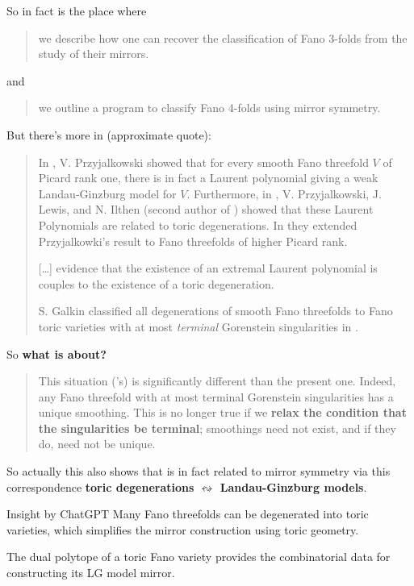 So in fact  \cite{mifa} is the place where 
\begin{quotation}
we describe how one can recover the classification of Fano 3-folds from the study of their mirrors.
\end{quotation}
and
\begin{quotation}
	we outline a program to classify Fano 4-folds using mirror symmetry.
\end{quotation}
But there's more in \cite{jan4} (approximate quote):
\begin{quotation}
	In \cite{prz09}, V. Przyjalkowski showed that for every smooth Fano threefold $V$ of Picard rank one, there is in fact a Laurent polynomial giving a weak Landau-Ginzburg model for $V$. Furthermore, in \cite{ilp13}, V. Przyjalkowski, J. Lewis, and N. Ilthen (second author of \cite{jan4}) showed that these Laurent Polynomials are related to toric degenerations. In \cite{qperiods} they extended Przyjalkowki's result to Fano threefolds of higher Picard rank.

	[…] evidence that the existence of an extremal Laurent polynomial is couples to the existence of a toric degeneration.

	S. Galkin classified all degenerations of smooth Fano threefolds to Fano toric varieties with at most \textit{terminal} Gorenstein singularities in \cite{galkin1}.
\end{quotation}
So \textbf{what is \cite{jan4} about?}
\begin{quotation}
	This situation (\cite{galkin1}'s) is significantly different than the present one. Indeed, any Fano threefold with at most terminal Gorenstein singularities has a unique smoothing.  This is no longer true if we \textbf{relax the condition that the singularities be terminal}; smoothings need not exist, and if they do, need not be unique. 
\end{quotation}

{\color{2}So actually this also shows that \cite{galkin1} is in fact related to mirror symmetry via this correspondence \textbf{toric degenerations $\leftrightsquigarrow$ Landau-Ginzburg models}.}

\begin{thing6}{Insight by ChatGPT}\leavevmode
Many Fano threefolds can be degenerated into toric varieties, which simplifies the mirror construction using toric geometry.

The dual polytope of a toric Fano variety provides the combinatorial data for constructing its LG model mirror.
\end{thing6}

